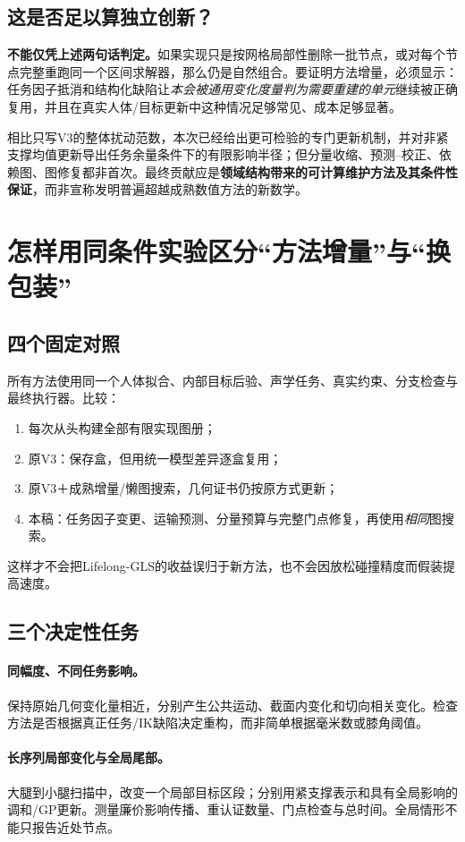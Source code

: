 \documentclass[UTF8,11pt,a4paper,fontset=fandol]{ctexart}
\numberwithin{equation}{section}
\theoremstyle{definition}
\begin{document}
\subsection{这是否足以算独立创新？}
\textbf{不能仅凭上述两句话判定。}如果实现只是按网格局部性删除一批节点，或对每个节点完整重跑同一个区间求解器，那么仍是自然组合。要证明方法增量，必须显示：任务因子抵消和结构化缺陷让\emph{本会被通用变化度量判为需要重建的单元}继续被正确复用，并且在真实人体/目标更新中这种情况足够常见、成本足够显著。

相比只写V3的整体扰动范数，本次已经给出更可检验的专门更新机制，并对非紧支撑均值更新导出任务余量条件下的有限影响半径；但分量收缩、预测--校正、依赖图、图修复都非首次。最终贡献应是\textbf{领域结构带来的可计算维护方法及其条件性保证}，而非宣称发明普遍超越成熟数值方法的新数学。

\section{怎样用同条件实验区分“方法增量”与“换包装”}
\subsection{四个固定对照}
所有方法使用同一个人体拟合、内部目标后验、声学任务、真实约束、分支检查与最终执行器。比较：
\begin{enumerate}
\item 每次从头构建全部有限实现图册；
\item 原V3：保存盒，但用统一模型差异逐盒复用；
\item 原V3＋成熟增量/懒图搜索，几何证书仍按原方式更新；
\item 本稿：任务因子变更、运输预测、分量预算与完整门点修复，再使用\emph{相同}图搜索。
\end{enumerate}
这样才不会把Lifelong-GLS的收益误归于新方法，也不会因放松碰撞精度而假装提高速度。

\subsection{三个决定性任务}
\paragraph{同幅度、不同任务影响。}保持原始几何变化量相近，分别产生公共运动、截面内变化和切向相关变化。检查方法是否根据真正任务/IK缺陷决定重构，而非简单根据毫米数或膝角阈值。

\paragraph{长序列局部变化与全局尾部。}大腿到小腿扫描中，改变一个局部目标区段；分别用紧支撑表示和具有全局影响的调和/GP更新。测量廉价影响传播、重认证数量、门点检查与总时间。全局情形不能只报告近处节点。
\end{document}
